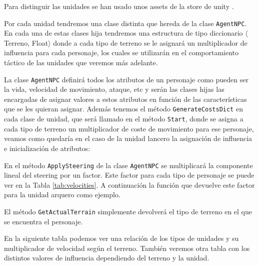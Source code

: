 Para distinguir las unidades se han usado unos assets de la store de unity \cite{toonrts}.

Por cada unidad tendremos una clase distinta que hereda de la clase \texttt{AgentNPC}. En cada una de estas clases hija tendremos una estructura de tipo diccionario $\langle$Terreno, Float$\rangle$ donde a cada tipo de terreno se le asignará un multiplicador de influencia para cada personaje, los cuales se utilizarán en el comportamiento táctico de las unidades que veremos más adelante.

La clase \texttt{AgentNPC} definirá todos los atributos de un personaje como pueden ser la vida, velocidad de movimiento, ataque, etc y serán las clases hijas las encargadas de asignar valores a estos atributos en función de las características que se les quieran asignar. Además tenemos el método \texttt{GenerateCostsDict} en cada clase de unidad, que será llamado en el método \texttt{Start}, donde se asigna a cada tipo de terreno un multiplicador de coste de movimiento para ese personaje, veamos como quedaría en el caso de la unidad lancero la asignación de influencia e inicialización de atributos:
    

    


En el método \texttt{ApplySteering} de la clase \texttt{AgentNPC} se multiplicará la componente lineal del steering por un factor. Este factor para cada tipo de personaje se puede ver en la Tabla \ref{tab:velocities}. A continuación la función que devuelve este factor para la unidad arquero como ejemplo.



El método \texttt{GetActualTerrain} simplemente devolverá el tipo de terreno en el que se encuentra el personaje.

En la siguiente tabla podemos ver una relación de los tipos de unidades y su multiplicador de velocidad según el terreno. También veremos otra tabla con los distintos valores de influencia dependiendo del terreno y la unidad.

